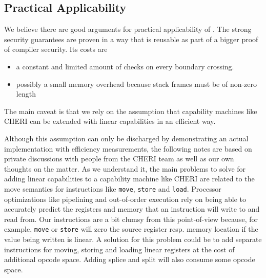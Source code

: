 \subsection{Practical Applicability}
We believe there are good arguments for practical applicability of \stktokens{}.
The strong security guarantees are proven in a way that is reusable as part of a bigger proof of compiler security.
Its costs are
\begin{itemize}
\item a constant and limited amount of checks on every boundary crossing.
\item possibly a small memory overhead because stack frames must be of non-zero length
\end{itemize}
The main caveat is that we rely on the assumption that capability machines like CHERI can be extended with linear capabilities in an efficient way.

Although this assumption can only be discharged by demonstrating an actual implementation with efficiency measurements, the following notes are based on private discussions with people from the CHERI team as well as our own thoughts on the matter.
As we understand it, the main problems to solve for adding linear capabilities to a capability machine like CHERI are related to the move semantics for instructions like \texttt{move}, \texttt{store} and \texttt{load}.
Processor optimizations like pipelining and out-of-order execution rely on being able to accurately predict the registers and memory that an instruction will write to and read from.
Our instructions are a bit clumsy from this point-of-view because, for example, \texttt{move} or \texttt{store} will zero the source register resp. memory location if the value being written is linear.
A solution for this problem could be to add separate instructions for moving, storing and loading linear registers at the cost of additional opcode space.
Adding splice and split will also consume some opcode space.

